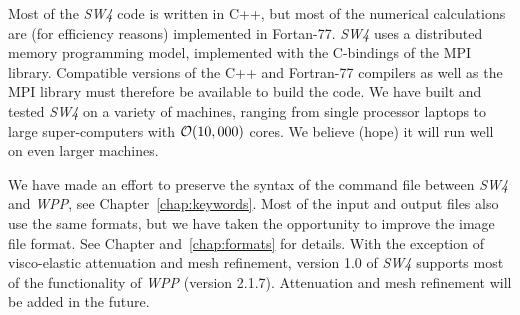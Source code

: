 \documentclass[11pt]{report}
\begin{document}


Most of the \emph{SW4} code is written in C++, but most of the numerical calculations are (for
efficiency reasons) implemented in Fortan-77. \emph{SW4} uses a distributed memory programming
model, implemented with the C-bindings of the MPI library. Compatible versions of the C++ and
Fortran-77 compilers as well as the MPI library must therefore be available to build the code. We
have built and tested \emph{SW4} on a variety of machines, ranging from single processor laptops to
large super-computers with ${\cal O}(10,000)$ cores. We believe (hope) it will run well on even
larger machines.

We have made an effort to preserve the syntax of the command file between \emph{SW4} and \emph{WPP},
see Chapter~\ref{chap:keywords}. Most of the input and output files also use the same
formats, but we have taken the opportunity to improve the image file format. See Chapter
and~\ref{chap:formats} for details. With the exception of visco-elastic attenuation and mesh
refinement, version 1.0 of \emph{SW4} supports most of the functionality of \emph{WPP} (version
2.1.7). Attenuation and mesh refinement will be added in the future.
\end{document}
